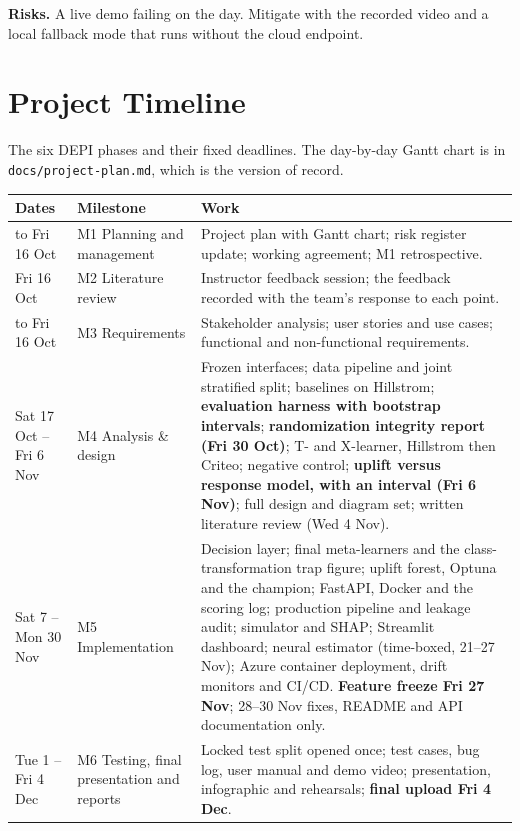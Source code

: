 \documentclass[11pt,a4paper]{article}
\begin{document}
\textbf{Risks.} A live demo failing on the day. Mitigate with the recorded video and a local
fallback mode that runs without the cloud endpoint.

\section{Project Timeline}
\label{sec:timeline}

The six DEPI phases and their fixed deadlines. The day-by-day Gantt chart is in
\texttt{docs/project-plan.md}, which is the version of record.

\begin{tabularx}{\textwidth}{@{}L{3.0cm}L{3.0cm}X@{}}
\toprule
\textbf{Dates} & \textbf{Milestone} & \textbf{Work} \\
\midrule
to Fri 16 Oct & M1 Planning and management & Project plan with Gantt chart; risk register
update; working agreement; M1 retrospective. \\
Fri 16 Oct & M2 Literature review & Instructor feedback session; the feedback recorded with the
team's response to each point. \\
to Fri 16 Oct & M3 Requirements & Stakeholder analysis; user stories and use cases; functional and
non-functional requirements. \\
Sat 17 Oct -- Fri 6 Nov & M4 Analysis \& design & Frozen interfaces; data pipeline and joint
stratified split; baselines on Hillstrom; \textbf{evaluation harness with bootstrap intervals};
\textbf{randomization integrity report (Fri 30 Oct)}; T- and X-learner, Hillstrom then Criteo;
negative control; \textbf{uplift versus response model, with an interval (Fri 6 Nov)}; full design
and diagram set; written literature review (Wed 4 Nov). \\
Sat 7 -- Mon 30 Nov & M5 Implementation & Decision layer; final meta-learners and the
class-transformation trap figure; uplift forest, Optuna and the champion; FastAPI, Docker and the
scoring log; production pipeline and leakage audit; simulator and SHAP; Streamlit dashboard; neural
estimator (time-boxed, 21--27 Nov); Azure container deployment, drift monitors and CI/CD. \textbf{Feature freeze Fri 27 Nov}; 28--30
Nov fixes, README and API documentation only. \\
Tue 1 -- Fri 4 Dec & M6 Testing, final presentation and reports & Locked test split opened once;
test cases, bug log, user manual and demo video; presentation, infographic and rehearsals;
\textbf{final upload Fri 4 Dec}. \\
\bottomrule
\end{tabularx}
\end{document}
